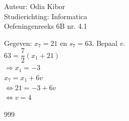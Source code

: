 \documentclass[a4paper]{article}
\begin{document}
  
\noindent \large Auteur: Odia Kibor \\
\noindent \large Studierichting: Informatica\\
\noindent \large Oefeningenreeks 6B nr. 4.1
\\

\medskip

\normalsize


Gegeven: $x_7 = 21$ en $s_7 = 63$. Bepaal $v$.\\

$63 = \dfrac{7}{2}(x_1 + 21)$\\

$\Rightarrow x_1 = -3$\\

$x_7 = x_1 + 6v$\\

$\Leftrightarrow 21 = -3 + 6v$\\

$\Leftrightarrow v = 4$\\




















\begin{thebibliography}{999}
\end{thebibliography}
\end{document}

